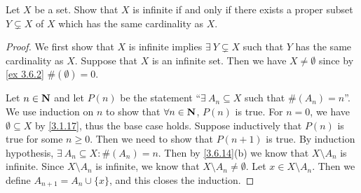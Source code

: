 \exercisesection

\begin{exercise}\label{ex 8.1.1}
  Let \(X\) be a set.
  Show that \(X\) is infinite if and only if there exists a proper subset \(Y \subsetneq X\) of \(X\) which has the same cardinality as \(X\).
\end{exercise}

\begin{proof}
  We first show that \(X\) is infinite implies \(\exists\ Y \subsetneq X\) such that \(Y\) has the same cardinality as \(X\).
  Suppose that \(X\) is an infinite set.
  Then we have \(X \neq \emptyset\) since by \cref{ex 3.6.2} \(\#(\emptyset) = 0\).

  Let \(n \in \mathbf{N}\) and let \(P(n)\) be the statement ``\(\exists\ A_n \subseteq X\) such that \(\#(A_n) = n\)''.
  We use induction on \(n\) to show that \(\forall n \in \mathbf{N}\), \(P(n)\) is true.
  For \(n = 0\), we have \(\emptyset \subseteq X\) by \cref{3.1.17}, thus the base case holds.
  Suppose inductively that \(P(n)\) is true for some \(n \geq 0\).
  Then we need to show that \(P(n + 1)\) is true.
  By induction hypothesis, \(\exists\ A_n \subseteq X : \#(A_n) = n\).
  Then by \cref{3.6.14}(b) we know that \(X \setminus A_n\) is infinite.
  Since \(X \setminus A_n\) is infinite, we know that \(X \setminus A_n \neq \emptyset\).
  Let \(x \in X \setminus A_n\).
  Then we define \(A_{n + 1} = A_n \cup \{x\}\), and this closes the induction.


\end{proof}
